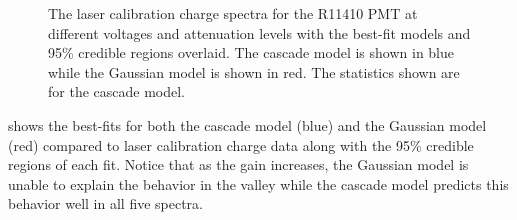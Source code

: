 \begin{figure}[p]



        \caption{The laser calibration charge spectra for the R11410 PMT at different voltages and attenuation levels with the best-fit models and 95\% credible regions overlaid.  The cascade model is shown in blue while the Gaussian model is shown in red.  The statistics shown are for the cascade model.}
    
        \label{fig:uc_best_fits}
\end{figure}


 shows the best-fits for both the cascade model (blue) and the Gaussian model (red) compared to laser calibration charge data along with the 95\% credible regions of each fit.  Notice that as the gain increases, the Gaussian model is unable to explain the behavior in the valley while the cascade model predicts this behavior well in all five spectra.




